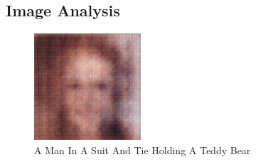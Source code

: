 \documentclass{article}%
\begin{document}
%
\subsection{Image Analysis}%
\label{subsec:ImageAnalysis}%


\begin{figure}[h!]%
\centering%
\includegraphics[width=150px]{500_fake_images/samples_5_159.png}%
\caption{A Man In A Suit And Tie Holding A Teddy Bear}%
\end{figure}

%
\end{document}
